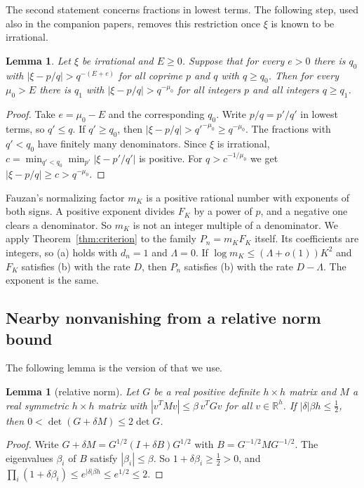 \documentclass[11pt]{amsart}
\newtheorem{lemma}[theorem]{Lemma}
\theoremstyle{definition}
\theoremstyle{remark}
\numberwithin{equation}{section}
\newcommand{\R}{\mathbb R}
\begin{document}
The second statement concerns fractions in lowest terms. The following step, used also in the companion papers,
removes this restriction once $\xi$ is known to be irrational.

\begin{lemma}\label{lem:plain}
Let $\xi$ be irrational and $E\ge0$. Suppose that for every $e>0$ there is $q_0$ with $|\xi-p/q|>q^{-(E+e)}$ for all
coprime $p$ and $q$ with $q\ge q_0$. Then for every $\mu_0>E$ there is $q_1$ with $|\xi-p/q|>q^{-\mu_0}$ for all
integers $p$ and all integers $q\ge q_1$.
\end{lemma}

\begin{proof}
Take $e=\mu_0-E$ and the corresponding $q_0$. Write $p/q=p'/q'$ in lowest terms, so $q'\le q$. If $q'\ge q_0$, then
$|\xi-p/q|>q'^{-\mu_0}\ge q^{-\mu_0}$. The fractions with $q'<q_0$ have finitely many denominators. Since $\xi$ is
irrational, $c=\min_{q'<q_0}\min_{p'}|\xi-p'/q'|$ is positive. For $q>c^{-1/\mu_0}$ we get $|\xi-p/q|\ge c>q^{-\mu_0}$.
\end{proof}

Fauzan's normalizing factor $m_K$ is a positive rational number with exponents of both signs. A positive exponent
divides $F_K$ by a power of $p$, and a negative one clears a denominator. So $m_K$ is not an integer multiple of a
denominator. We apply Theorem~\ref{thm:criterion} to the family $P_n=m_KF_K$ itself. Its coefficients are integers, so
(a) holds with $d_n=1$ and $\Lambda=0$. If $\log m_K\le(\Lambda+o(1))K^2$ and $F_K$ satisfies (b) with the rate $D$,
then $P_n$ satisfies (b) with the rate $D-\Lambda$. The exponent is the same.

\subsection{Nearby nonvanishing from a relative norm bound}
The following lemma is the version of \cite[Appendix~C]{Fauzan2026} that we use.

\begin{lemma}[relative norm]\label{lem:relnorm}
Let $G$ be a real positive definite $h\times h$ matrix and $M$ a real symmetric $h\times h$ matrix with
$|v^TMv|\le\beta\,v^TGv$ for all $v\in\R^h$. If $|\delta|\beta h\le\frac12$, then $0<\det(G+\delta M)\le2\det G$.
\end{lemma}

\begin{proof}
Write $G+\delta M=G^{1/2}(I+\delta B)G^{1/2}$ with $B=G^{-1/2}MG^{-1/2}$. The eigenvalues $\beta_i$ of $B$ satisfy
$|\beta_i|\le\beta$. So $1+\delta\beta_i\ge\frac12>0$, and $\prod_i(1+\delta\beta_i)\le e^{|\delta|\beta h}\le e^{1/2}\le2$.
\end{proof}
\end{document}
